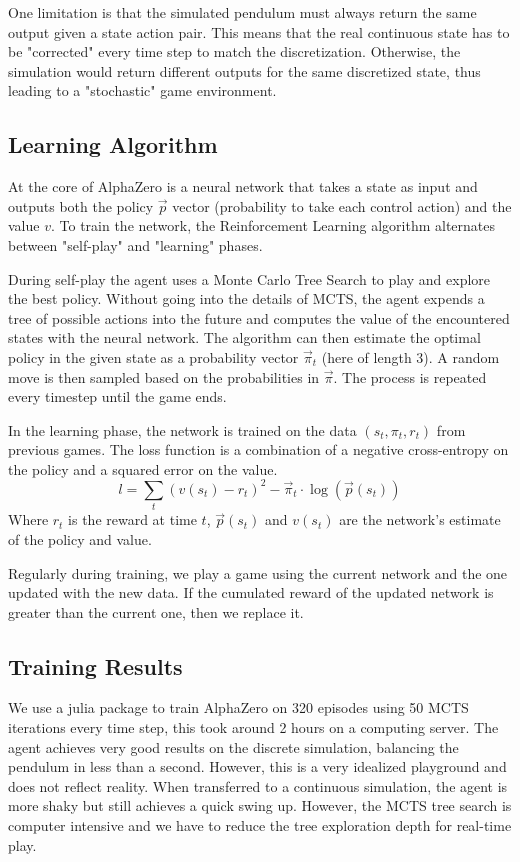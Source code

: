 \documentclass{LTHtwocol} %
\begin{document}
One limitation is that the simulated pendulum must always return the same output given a state action pair. This means that the real continuous state has to be "corrected" every time step to match the discretization. Otherwise, the simulation would return different outputs for the same discretized state, thus leading to a "stochastic" game environment.

\subsection{Learning Algorithm}


At the core of AlphaZero is a neural network that takes a state as input and outputs both the  policy $\vec{p}$ vector (probability to take each control action) and the value $v$. To train the network, the Reinforcement Learning algorithm alternates between "self-play" and "learning" phases.


During self-play the agent uses a Monte Carlo Tree Search to play and explore the best policy. Without going into the details of MCTS, the agent expends a tree of possible actions into the future and computes the value of the encountered states with the neural network. The algorithm can then estimate the optimal policy in the given state as a probability vector $\vec{\pi}_t$ (here of length 3). A random move is then sampled based on the probabilities in $\vec{\pi}$. The process is repeated every timestep until the game ends.


In the learning phase, the network is trained on the data $(s_t, \pi_t, r_t)$ from previous games. The loss function is a combination of a negative cross-entropy on the policy and a squared error on the value.
$$l = \sum_t (v(s_t) - r_t)^2 - \vec{\pi}_t \cdot \log(\vec{p}(s_t))$$
Where $r_t$ is the reward at time $t$, $\vec{p}(s_t)$ and $v(s_t)$ are the network's estimate of the policy and value.

Regularly during training, we play a game using the current network and the one updated with the new data. If the cumulated reward of the updated network is greater than the current one, then we replace it.

\subsection{Training Results}

We use a julia package \cite{Laurent2020AlphaZero} to train AlphaZero on 320 episodes using 50 MCTS iterations every time step, this took around 2 hours on a computing server. The agent achieves very good results on the discrete simulation, balancing the pendulum in less than a second. However, this is a very idealized playground and does not reflect reality. When transferred to a continuous simulation, the agent is more shaky but still achieves a quick swing up. However, the MCTS tree search is computer intensive and we have to reduce the tree exploration depth for real-time play.
\end{document}
